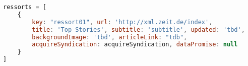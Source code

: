 \begin{lstlisting}[language= Javascript,caption=Auszug aus dem Ressorts Array., label={lst:ressortsarray}]
ressorts = [
	{
	    key: "ressort01", url: 'http://xml.zeit.de/index',
	    title: 'Top Stories', subtitle: 'subtitle', updated: 'tbd',
	    backgroundImage: 'tbd', articleLink: "tdb",
	    acquireSyndication: acquireSyndication, dataPromise: null
    }
]
\end{lstlisting}